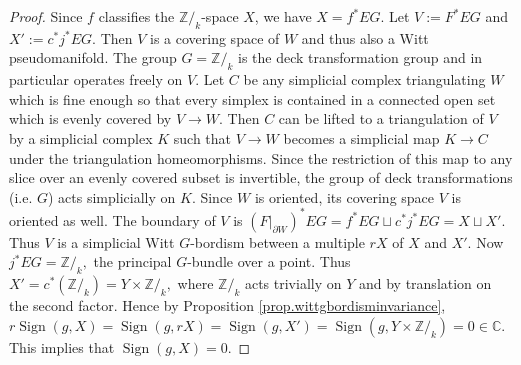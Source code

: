 \documentclass[10pt,a4paper]{amsart}
\newcommand {\Sign}    {{\ensuremath{\operatorname{Sign}}}}
\newcommand {\cplx}  {\ensuremath{\mathbb{C}}}
\newcommand {\intg}  {\ensuremath{\mathbb{Z}}}
\begin{document}
\begin{proof}
Since $f$ classifies the $\intg/_k$-space $X$, we have
$X = f^* EG$. 
Let $V := F^* EG$ and $X' := c^* j^* EG$.
Then $V$ is a covering space of $W$ and thus also a Witt pseudomanifold.
The group $G=\intg/_k$ is the deck transformation group and in particular
operates freely on $V$.
Let $C$ be any simplicial complex triangulating $W$ which is fine enough 
so that every simplex
is contained in a connected open set which is evenly covered by $V\to W$.
Then $C$ can be lifted to a triangulation of $V$ by a simplicial complex $K$
such that $V\to W$ becomes a simplicial map $K\to C$
under the triangulation homeomorphisms.
Since the restriction of this map to any slice over an evenly covered subset
is invertible, the group of
deck transformations (i.e. $G$) acts simplicially on $K$.
Since $W$ is oriented, its covering space $V$ is oriented as well.
The boundary of $V$ is 
$(F|_{\partial W})^* EG = f^* EG \sqcup c^* j^* EG = X \sqcup X'.$
Thus $V$ is a simplicial Witt $G$-bordism between a multiple $rX$ of $X$
and $X'$. Now $j^* EG = \intg/_k,$ the principal $G$-bundle over a point.
Thus
$X' = c^* (\intg/_k) = Y \times \intg/_k,$
where $\intg/_k$ acts trivially on $Y$ and by translation on the second factor.
Hence by Proposition \ref{prop.wittgbordisminvariance}, 
$r\Sign (g,X) = \Sign (g, rX) = \Sign (g,X') = \Sign (g,Y\times \intg/_k)=0 \in \cplx$.
This implies that $\Sign (g,X)=0$.
\end{proof}
\end{document}
